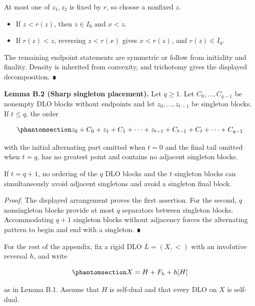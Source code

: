 \documentclass[
  english,
  11pt,
  reqno]{amsart}
\newcounter{none} %
\providecommand{\tightlist}{%
  \setlength{\itemsep}{0pt}\setlength{\parskip}{0pt}}
\begin{document}
At most one of \(z_1,z_2\) is fixed by \(r\), so choose a nonfixed
\(z\).

\begin{itemize}
\tightlist
\item
  If \(z<r(z)\), then \(z\in I_0\) and \(x<z\).
\item
  If \(r(z)<z\), reversing \(z<r(x)\) gives \(x<r(z)\), and
  \(r(z)\in I_0\).
\end{itemize}

The remaining endpoint statements are symmetric or follow from
initiality and finality. Density is inherited from convexity, and
trichotomy gives the displayed decomposition. ∎

\protect{}\label{lem:b-2-singleton-placement}

\textbf{Lemma B.2 (Sharp singleton placement).} Let \(q\ge1\). Let
\(C_0,\ldots,C_{q-1}\) be nonempty DLO blocks without endpoints and let
\(z_0,\ldots,z_{t-1}\) be singleton blocks. If \(t\le q\), the order

\begin{equation}\protect\phantomsection\label{eq:typefree-singleton-placement}{
z_0+C_0+z_1+C_1+\cdots+z_{t-1}+C_{t-1}
+C_t+\cdots+C_{q-1}
}\end{equation}

with the initial alternating part omitted when \(t=0\) and the final
tail omitted when \(t=q\), has no greatest point and contains no
adjacent singleton blocks.

If \(t=q+1\), no ordering of the \(q\) DLO blocks and the \(t\)
singleton blocks can simultaneously avoid adjacent singletons and avoid
a singleton final block.

\emph{Proof.} The displayed arrangement proves the first assertion. For
the second, \(q\) nonsingleton blocks provide at most \(q\) separators
between singleton blocks. Accommodating \(q+1\) singleton blocks without
adjacency forces the alternating pattern to begin and end with a
singleton. ∎

For the rest of the appendix, fix a rigid DLO \(L=(X,<)\) with an
involutive reversal \(h\), and write

\begin{equation}\protect\phantomsection\label{eq:typefree-root-decomposition}{
X=H+F_h+h[H]
}\end{equation}

as in Lemma B.1. Assume that \(H\) is self-dual and that every DLO on
\(X\) is self-dual.

\protect{}\label{lem:b-3-child-localization}
\end{document}
